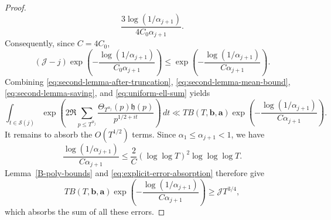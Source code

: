 \documentclass[twoside,reqno,11pt,a4paper]{amsart}
\numberwithin{equation}{section}
\theoremstyle{plain}
\theoremstyle{definition}
\theoremstyle{remark}
\renewcommand{\le}{\leqslant}
\renewcommand{\ge}{\geqslant}
\begin{document}
\begin{proof}
\begin{equation*}
        \frac{3\log(1/\alpha_{j+1})}{4C_0\alpha_{j+1}}.
\end{equation*}
Consequently, since $C=4C_0$,
\begin{equation}\label{eq:uniform-ell-sum}
        (\mathcal J-j)
        \exp\left(-\frac{\log(1/\alpha_{j+1})}{C_0\alpha_{j+1}}\right)
        \le
        \exp\left(-\frac{\log(1/\alpha_{j+1})}{C\alpha_{j+1}}\right).
\end{equation}
Combining \eqref{eq:second-lemma-after-truncation}, \eqref{eq:second-lemma-mean-bound}, \eqref{eq:second-lemma-saving}, and \eqref{eq:uniform-ell-sum} yields
\begin{equation*}
        \int_{t\in\mathcal S(j)}
        \exp\left(2\Re\sum_{p\le  T^{\alpha_j}}
        \frac{\Theta_{T^{\alpha_j}}(p)\mathfrak h(p)}{p^{1/2+it}}\right)\,dt
        \ll
        T B(T,\mathbf b,\mathbf a)
        \exp\left(-\frac{\log(1/\alpha_{j+1})}{C\alpha_{j+1}}\right).
\end{equation*}
It remains to absorb the $O(T^{1/2})$ terms.  Since
$\alpha_1\le\alpha_{j+1}<1$, we have
\begin{equation*}
        \frac{\log(1/\alpha_{j+1})}{C\alpha_{j+1}}
        \le
        \frac2C(\log\log T)^2\log\log\log T.
\end{equation*}
Lemma~\ref{B-poly-bounds} and
\eqref{eq:explicit-error-absorption} therefore give
\begin{equation*}
        T B(T,\mathbf b,\mathbf a)
        \exp\left(-\frac{\log(1/\alpha_{j+1})}{C\alpha_{j+1}}\right)
        \ge \mathcal J T^{3/4},
\end{equation*}
which absorbs the sum of all these errors.


\end{proof}
\end{document}
